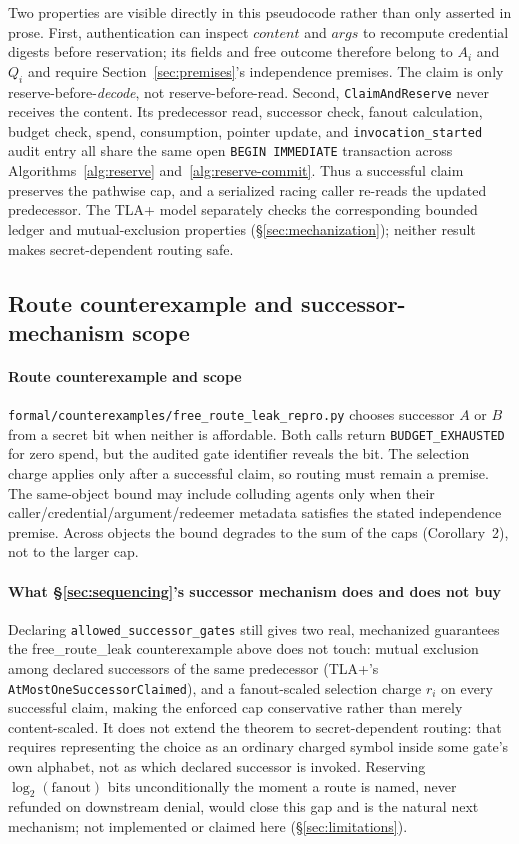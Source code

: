 \documentclass[conference,compsoc]{IEEEtran}
\newcommand{\rev}[1]{#1} %
\begin{document}
{Two properties are visible directly in this pseudocode rather than only
asserted in prose. First, authentication can inspect $content$ and $args$ to
recompute credential digests before reservation; its fields and free outcome
therefore belong to $A_i$ and $Q_i$ and require Section~\ref{sec:premises}'s
independence premises. The claim is only reserve-before-\emph{decode}, not
reserve-before-read. Second, \texttt{ClaimAndReserve} never receives the
content. Its predecessor read, successor check, fanout calculation, budget
check, spend, consumption, pointer update, and \texttt{invocation\_started}
audit entry all share the same open \texttt{BEGIN IMMEDIATE} transaction
across Algorithms~\ref{alg:reserve} and~\ref{alg:reserve-commit}. Thus a
successful claim preserves the pathwise cap, and a serialized racing caller
re-reads the updated predecessor. The TLA+ model separately checks the
corresponding bounded ledger and mutual-exclusion properties
(\S\ref{sec:mechanization}); neither result makes secret-dependent routing safe.

\subsection{Route counterexample and successor-mechanism scope}
\label{sec:route-scope}

\paragraph{Route counterexample and scope}
\nolinkurl{formal/counterexamples/free\_route\_leak\_repro.py} chooses successor
$A$ or $B$ from a secret bit when neither is affordable. Both calls return
\texttt{BUDGET\_EXHAUSTED} for zero spend, but the audited gate identifier
reveals the bit. The selection charge applies only after a successful claim,
so routing must remain a premise. The same-object bound may include colluding
agents only when their caller/credential/argument/redeemer metadata satisfies
the stated independence premise. \rev{Across objects the bound degrades to the sum of the caps (Corollary~2), not to the larger cap.}

\paragraph{What \S\ref{sec:sequencing}'s successor mechanism does and does not buy} Declaring \texttt{allowed\_successor\_gates} still gives two
real, mechanized guarantees the free\_route\_leak counterexample above
does not touch: mutual exclusion among declared successors of the same
predecessor (TLA+'s \texttt{AtMostOneSuccessorClaimed}), and a
fanout-scaled selection charge $r_i$ on every successful claim, making
the enforced cap conservative rather than merely content-scaled. It does
not extend the theorem to secret-dependent routing: that requires
representing the choice as an ordinary charged symbol inside some gate's
own alphabet, not as which declared successor is invoked. Reserving
$\log_2(\mathrm{fanout})$ bits unconditionally the moment a route is
named, never refunded on downstream denial, would close this gap and is
the natural next mechanism; not implemented or claimed here
(\S\ref{sec:limitations}).

}
\end{document}
